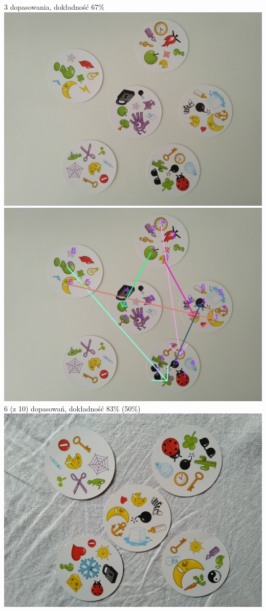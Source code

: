 \documentclass[10pt,a4paper]{article}
\begin{document}
\begin{center}
3 dopasowania, dokładność 67\%
\includegraphics[scale=0.28]{hard/dobble20.jpg}
\includegraphics[scale=0.28]{hard/img_arrows7.jpg}\\
6 (z 10) dopasowań, dokładność 83\% (50\%)
\includegraphics[scale=0.28]{hard/dobble25.jpg}

\end{center}
\end{document}
